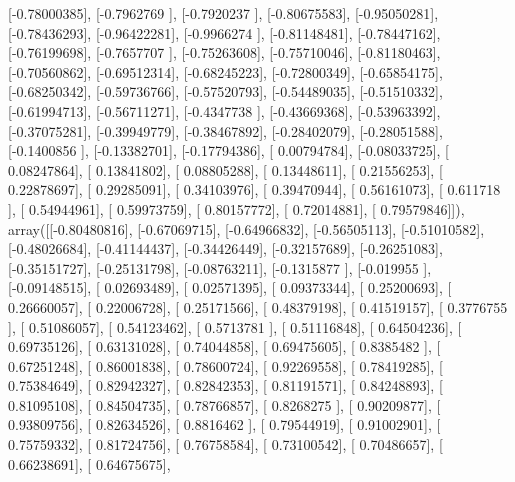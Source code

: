 \documentclass{article}
\begin{document}
       [-0.78000385],
       [-0.7962769 ],
       [-0.7920237 ],
       [-0.80675583],
       [-0.95050281],
       [-0.78436293],
       [-0.96422281],
       [-0.9966274 ],
       [-0.81148481],
       [-0.78447162],
       [-0.76199698],
       [-0.7657707 ],
       [-0.75263608],
       [-0.75710046],
       [-0.81180463],
       [-0.70560862],
       [-0.69512314],
       [-0.68245223],
       [-0.72800349],
       [-0.65854175],
       [-0.68250342],
       [-0.59736766],
       [-0.57520793],
       [-0.54489035],
       [-0.51510332],
       [-0.61994713],
       [-0.56711271],
       [-0.4347738 ],
       [-0.43669368],
       [-0.53963392],
       [-0.37075281],
       [-0.39949779],
       [-0.38467892],
       [-0.28402079],
       [-0.28051588],
       [-0.1400856 ],
       [-0.13382701],
       [-0.17794386],
       [ 0.00794784],
       [-0.08033725],
       [ 0.08247864],
       [ 0.13841802],
       [ 0.08805288],
       [ 0.13448611],
       [ 0.21556253],
       [ 0.22878697],
       [ 0.29285091],
       [ 0.34103976],
       [ 0.39470944],
       [ 0.56161073],
       [ 0.611718  ],
       [ 0.54944961],
       [ 0.59973759],
       [ 0.80157772],
       [ 0.72014881],
       [ 0.79579846]]), array([[-0.80480816],
       [-0.67069715],
       [-0.64966832],
       [-0.56505113],
       [-0.51010582],
       [-0.48026684],
       [-0.41144437],
       [-0.34426449],
       [-0.32157689],
       [-0.26251083],
       [-0.35151727],
       [-0.25131798],
       [-0.08763211],
       [-0.1315877 ],
       [-0.019955  ],
       [-0.09148515],
       [ 0.02693489],
       [ 0.02571395],
       [ 0.09373344],
       [ 0.25200693],
       [ 0.26660057],
       [ 0.22006728],
       [ 0.25171566],
       [ 0.48379198],
       [ 0.41519157],
       [ 0.3776755 ],
       [ 0.51086057],
       [ 0.54123462],
       [ 0.5713781 ],
       [ 0.51116848],
       [ 0.64504236],
       [ 0.69735126],
       [ 0.63131028],
       [ 0.74044858],
       [ 0.69475605],
       [ 0.8385482 ],
       [ 0.67251248],
       [ 0.86001838],
       [ 0.78600724],
       [ 0.92269558],
       [ 0.78419285],
       [ 0.75384649],
       [ 0.82942327],
       [ 0.82842353],
       [ 0.81191571],
       [ 0.84248893],
       [ 0.81095108],
       [ 0.84504735],
       [ 0.78766857],
       [ 0.8268275 ],
       [ 0.90209877],
       [ 0.93809756],
       [ 0.82634526],
       [ 0.8816462 ],
       [ 0.79544919],
       [ 0.91002901],
       [ 0.75759332],
       [ 0.81724756],
       [ 0.76758584],
       [ 0.73100542],
       [ 0.70486657],
       [ 0.66238691],
       [ 0.64675675],
\end{document}
